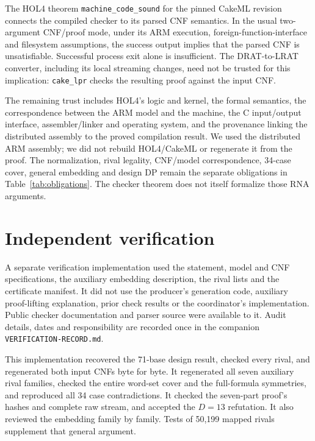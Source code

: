 \documentclass[11pt,a4paper]{article}
\theoremstyle{definition}
\begin{document}
The HOL4 theorem \texttt{machine\_code\_sound} for the pinned CakeML
revision connects the compiled checker to its parsed CNF semantics.
In the usual two-argument CNF/proof mode, under its ARM execution,
foreign-function-interface and filesystem assumptions, the success
output implies that the parsed CNF is unsatisfiable. Successful process
exit alone is insufficient. The DRAT-to-LRAT converter, including its
local streaming changes, need not be trusted for this implication:
\texttt{cake\_lpr} checks the resulting proof against the input CNF.

The remaining trust includes HOL4's logic and kernel, the formal
semantics, the correspondence between the ARM model and the machine,
the C input/output interface, assembler/linker and operating system,
and the provenance linking the distributed assembly to the proved
compilation result. We used the distributed ARM assembly; we did not
rebuild HOL4/CakeML or regenerate it from the proof. The normalization,
rival legality, CNF/model correspondence, 34-case cover, general
embedding and design DP remain the separate obligations in
Table~\ref{tab:obligations}. The checker theorem does not itself
formalize those RNA arguments.

\section{Independent verification}\label{sec:independent}
A separate verification implementation used the statement, model and
CNF specifications, the auxiliary embedding description, the rival
lists and the certificate manifest. It did not use the producer's
generation code, auxiliary proof-lifting explanation, prior check
results or the coordinator's implementation. Public checker
documentation and parser source were available to it. Audit details,
dates and responsibility are recorded once in the companion
\texttt{VERIFICATION-RECORD.md}.

This implementation recovered the 71-base design result, checked every
rival, and regenerated both input CNFs byte for byte. It regenerated
all seven auxiliary rival families, checked the entire word-set cover
and the full-formula symmetries, and reproduced all 34 case
contradictions. It checked the seven-part proof's hashes and complete
raw stream, and accepted the $D=13$ refutation. It also reviewed the
embedding family by family. Tests of 50,199 mapped rivals supplement
that general argument.
\end{document}
